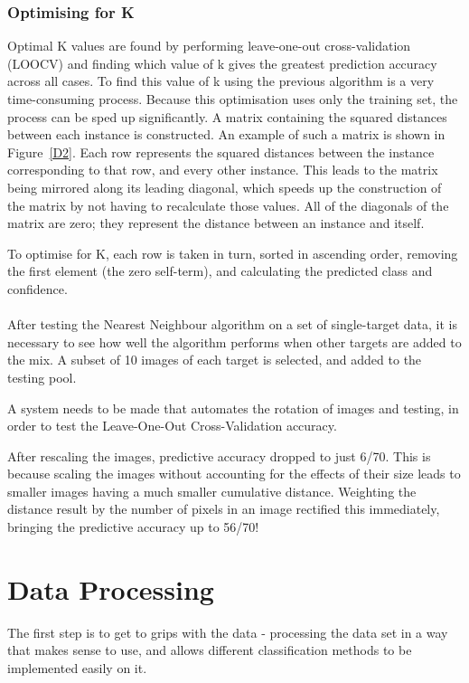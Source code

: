 \subsubsection{Optimising for K}
Optimal K values are found by performing leave-one-out cross-validation (LOOCV) and finding which value of k gives the greatest prediction accuracy across all cases. To find this value of k using the previous algorithm is a very time-consuming process. Because this optimisation uses only the training set, the process can be sped up significantly. A matrix containing the squared distances between each instance is constructed. An example of such a matrix is shown in Figure~\ref{D2}. Each row represents the squared distances between the instance corresponding to that row, and every other instance. This leads to the matrix being mirrored along its leading diagonal, which speeds up the construction of the matrix by not having to recalculate those values. All of the diagonals of the matrix are zero; they represent the distance between an instance and itself. 

To optimise for K, each row is taken in turn, sorted in ascending order, removing the first element (the zero self-term), and calculating the predicted class and confidence.



\paragraph{}
After testing the Nearest Neighbour algorithm on a set of single-target data, it is necessary to see how well the algorithm performs when other targets are added to the mix. A subset of 10 images of each target is selected, and added to the testing pool.

A system needs to be made that automates the rotation of images and testing, in order to test the Leave-One-Out Cross-Validation accuracy.

After rescaling the images, predictive accuracy dropped to just 6/70. This is because scaling the images without accounting for the effects of their size leads to smaller images having a much smaller cumulative distance. Weighting the distance result by the number of pixels in an image rectified this immediately, bringing the predictive accuracy up to 56/70!



\section{Data Processing}
The first step is to get to grips with the data - processing the data set in a way that makes sense to use, and allows different classification methods to be implemented easily on it.

